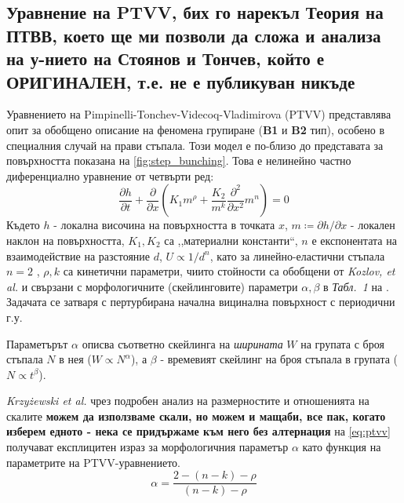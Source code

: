 \subsection{Уравнение на PTVV, бих го нарекъл Теория на ПТВВ, което ще ми позволи да сложа и анализа на у-нието на Стоянов и Тончев, който е ОРИГИНАЛЕН, т.е. не е публикуван никъде}
Уравнението на Pimpinelli-Tonchev-Videcoq-Vladimirova (PTVV) \cite{Pimpinelli2002} \cite{2Krug2005} представлява опит за обобщено описание на феномена групиране (\textbf{B1} и \textbf{B2} тип), особено в специалния случай на прави стъпала. Този модел е по-близо до представата за повърхността показана на \autoref{fig:step_bunching}. Това е нелинейно частно диференциално уравнение от четвърти ред:
\begin{equation}
    \frac{\partial h}{\partial t} + \frac{\partial }{\partial x} \left( K_{1} m^{\rho} + \frac{K_2}{m^k} \frac{\partial^2 }{\partial x^2} m ^ n \right) = 0
    \label{eq:ptvv}
\end{equation}
Където $h$ - локална височина на повърхността в точката $x$, $m \coloneqq \partial h / \partial x$ - локален наклон на повърхността, $K_1, K_2$ са ,,материални константи``, $n$ е експонентата на взаимодействие на разстояние $d$, $U \propto 1/d^n$, като за линейно-еластични стъпала $n = 2$ \cite{Kozlov2022}, $\rho, k$ са кинетични параметри, чиито стойности са обобщени от \textit{Kozlov, et al.} и свързани с морфологичните (скейлинговите) параметри $\alpha, \beta$ в \textit{Табл.~1} на \cite{Kozlov2022}. Задачата се затваря с пертурбирана начална вицинална повърхност с периодични г.у. 

Параметърът $\alpha$ описва съответно скейлинга на \textit{ширината} $W$ на групата с броя стъпала $N$ в нея ($W \propto N^\alpha$), а $\beta$ - времевият скейлинг на броя стъпала в групата ($N \propto t^\beta$).

\textit{Krzyżewski et al.} чрез подробен анализ на размерностите и отношенията на скалите \textbf{можем да използваме скали, но можем и мащаби, все пак, когато изберем едното - нека се придържаме към него без алтернация} на \autoref{eq:ptvv} \cite{Krzyewski2018} получават експлицитен израз за морфологичния параметър $\alpha$ като функция на параметрите на PTVV-уравнението.
\begin{equation}
    \alpha = \frac{2 - (n-k) - \rho}{(n-k) - \rho}
    \label{eq:alpha_ptvv}
\end{equation}

